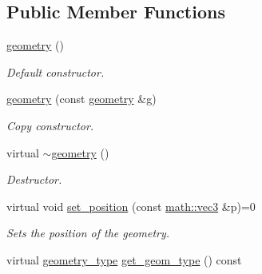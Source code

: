 \subsection*{Public Member Functions}
\begin{DoxyCompactItemize}
\item 
\mbox{\label{classphysim_1_1geometric_1_1geometry_a79e4756803e45be5f1cfeb7d40668c7c}} 
\hyperlink{classphysim_1_1geometric_1_1geometry_a79e4756803e45be5f1cfeb7d40668c7c}{geometry} ()
\begin{DoxyCompactList}\small\item\em Default constructor. \end{DoxyCompactList}\item 
\mbox{\label{classphysim_1_1geometric_1_1geometry_a9274693e558edca5464d1945eb26f327}} 
\hyperlink{classphysim_1_1geometric_1_1geometry_a9274693e558edca5464d1945eb26f327}{geometry} (const \hyperlink{classphysim_1_1geometric_1_1geometry}{geometry} \&g)
\begin{DoxyCompactList}\small\item\em Copy constructor. \end{DoxyCompactList}\item 
\mbox{\label{classphysim_1_1geometric_1_1geometry_a3ad710d087fd0edadb584ce22feb4d2b}} 
virtual \hyperlink{classphysim_1_1geometric_1_1geometry_a3ad710d087fd0edadb584ce22feb4d2b}{$\sim$geometry} ()
\begin{DoxyCompactList}\small\item\em Destructor. \end{DoxyCompactList}\item 
virtual void \hyperlink{classphysim_1_1geometric_1_1geometry_a5b029b5fa8e55847d5aa06b1d341c88c}{set\+\_\+position} (const \hyperlink{structphysim_1_1math_1_1vec3}{math\+::vec3} \&p)=0
\begin{DoxyCompactList}\small\item\em Sets the position of the geometry. \end{DoxyCompactList}\item 
\mbox{\label{classphysim_1_1geometric_1_1geometry_afab4343665170b22328a3c46359de5d1}} 
virtual \hyperlink{namespacephysim_1_1geometric_ac2794fff270c5b2ff4307f107a365fca}{geometry\+\_\+type} \hyperlink{classphysim_1_1geometric_1_1geometry_afab4343665170b22328a3c46359de5d1}{get\+\_\+geom\+\_\+type} () const

\end{DoxyCompactItemize}
